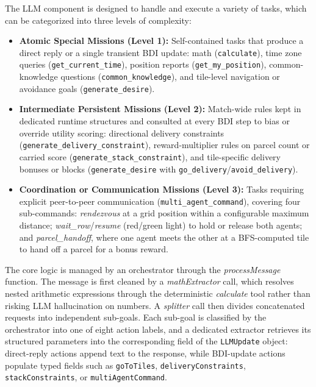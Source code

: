 The LLM component is designed to handle and execute a variety of tasks, which can be categorized into three levels of complexity:
\begin{itemize}
    \item \textbf{Atomic Special Missions (Level 1):} Self-contained tasks that produce a direct reply or a single transient BDI update: math (\texttt{calculate}), time zone queries (\texttt{get\_current\_time}), position reports (\texttt{get\_my\_position}), common-knowledge questions (\texttt{common\_knowledge}), and tile-level navigation or avoidance goals (\texttt{generate\_desire}).

    \item \textbf{Intermediate Persistent Missions (Level 2):} Match-wide rules kept in dedicated runtime structures and consulted at every BDI step to bias or override utility scoring: directional delivery constraints (\texttt{generate\_delivery\_constraint}), reward-multiplier rules on parcel count or carried score (\texttt{generate\_stack\_constraint}), and tile-specific delivery bonuses or blocks (\texttt{generate\_desire} with \texttt{go\_delivery}/\texttt{avoid\_delivery}).

    \item \textbf{Coordination or Communication Missions (Level 3):} Tasks requiring explicit peer-to-peer communication (\texttt{multi\_agent\_command}), covering four sub-commands: \textit{rendezvous} at a grid position within a configurable maximum distance; \textit{wait\_row}/\textit{resume} (red/green light) to hold or release both agents; and \textit{parcel\_handoff}, where one agent meets the other at a BFS-computed tile to hand off a parcel for a bonus reward.
\end{itemize}

The core logic is managed by an orchestrator through the \textit{processMessage} function. The message is first cleaned by a \textit{mathExtractor} call, which resolves nested arithmetic expressions through the deterministic \textit{calculate} tool rather than risking LLM hallucination on numbers. A \textit{splitter} call then divides concatenated requests into independent sub-goals. Each sub-goal is classified by the orchestrator into one of eight action labels, and a dedicated extractor retrieves its structured parameters into the corresponding field of the \texttt{LLMUpdate} object: direct-reply actions append text to the response, while BDI-update actions populate typed fields such as \texttt{goToTiles}, \texttt{deliveryConstraints}, \texttt{stackConstraints}, or \texttt{multiAgentCommand}.

